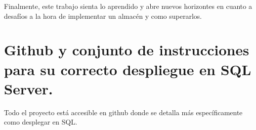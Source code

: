 \documentclass[12pt, a4paper, twoside]{article}
\begin{document}
	
	Finalmente, este trabajo sienta lo aprendido y abre nuevos horizontes en cuanto a desafíos a la hora de implementar un almacén y como superarlos. 
	


	\section{Github y conjunto de instrucciones para su correcto despliegue en SQL Server.}

	Todo el proyecto está accesible en github \cite{depab2024} donde se detalla más específicamente como desplegar en SQL.
	\printbibliography
	
	
	
	
\end{document}
